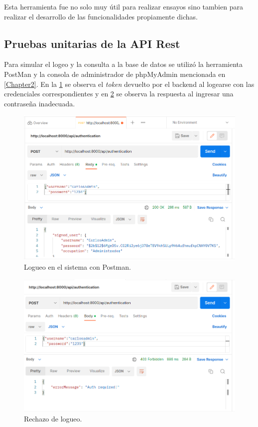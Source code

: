 Esta herramienta fue no solo muy útil para realizar ensayos sino tambien para realizar el desarrollo de las funcionalidades propiamente dichas.

\subsection{Pruebas unitarias de la API Rest}

Para simular el logeo y la consulta a la base de datos se utilizó la herramienta PostMan \citep{WEBSITE:30} y la consola de administrador de phpMyAdmin mencionada en \ref{Chapter2}. En la \ref{fig:Logueo en el sistema con Postman} se observa el \textit{token} devuelto por el backend al logearse con las credenciales correspondientes y en \ref{fig:Rechazo Logueo en el sistema con Postman} se observa la respuesta al ingresar una contraseña inadecuada.

\begin{figure}[ht]
	\centering
	\includegraphics[scale=.35]{./Figures/auth.png}
	\caption{Logueo en el sistema con Postman.}
	\label{fig:Logueo en el sistema con Postman}
\end{figure}

\begin{figure}[ht]
	\centering
	\includegraphics[scale=.35]{./Figures/no-auth.png}
	\caption{Rechazo de logueo.}
	\label{fig:Rechazo Logueo en el sistema con Postman}
\end{figure}


